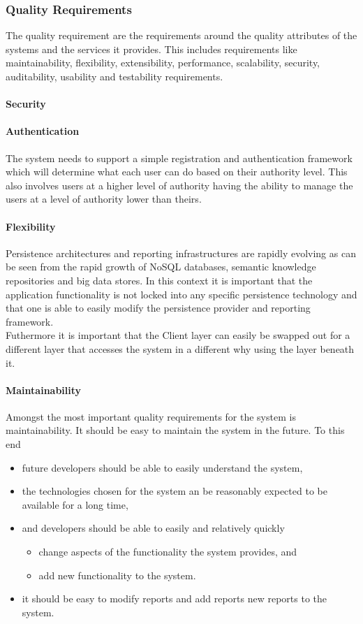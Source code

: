 \subsubsection{Quality Requirements}
The quality requirement are the requirements around the quality attributes of
the systems and the services it provides. This includes requirements like
maintainability, flexibility, extensibility, performance, scalability, security,
auditability, usability and testability requirements.
\paragraph{Security}
\label{sec:securityQualityRequirement}
\paragraph{Authentication}
The system needs to support a simple registration and authentication framework
which will determine what each user can do based on their authority level. This
also involves users at a higher level of authority having the ability to manage
the users at a level of authority lower than theirs.
\paragraph{Flexibility}
Persistence architectures and reporting infrastructures are rapidly evolving as can
be seen from the rapid growth of NoSQL databases, semantic knowledge repositories and big data
stores. In this context it is important that the application functionality is not locked into any
specific persistence technology and that one is able to easily modify the persistence provider and
reporting framework.\\
Futhermore it is important that the Client layer can easily be swapped out for a different
layer that accesses the system in a different why using the layer beneath it.
\paragraph{Maintainability}
Amongst the most important quality requirements for the system is
maintainability. It should be easy to maintain the system in the future. To this end

\begin{itemize}
\item future developers should be able to easily understand the system,
\item the technologies chosen for the system an be reasonably expected to be available for a long
time,
\item and developers should be able to easily and relatively quickly
	\begin{itemize}
		\item change aspects of the functionality the system provides, and
		\item add new functionality to the system.
	\end{itemize}
\item it should be easy to modify reports and add reports new reports to the system.
\end{itemize}

